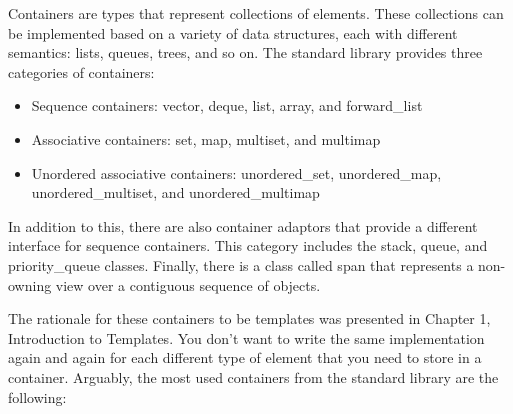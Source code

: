 Containers are types that represent collections of elements. These collections can be implemented based on a variety of data structures, each with different semantics: lists, queues, trees, and so on. The standard library provides three categories of containers:

\begin{itemize}
\item
Sequence containers: vector, deque, list, array, and forward\_list

\item
Associative containers: set, map, multiset, and multimap

\item
Unordered associative containers: unordered\_set, unordered\_map, unordered\_multiset, and unordered\_multimap
\end{itemize}

In addition to this, there are also container adaptors that provide a different interface for sequence containers. This category includes the stack, queue, and priority\_queue classes. Finally, there is a class called span that represents a non-owning view over a contiguous sequence of objects.

The rationale for these containers to be templates was presented in Chapter 1, Introduction to Templates. You don’t want to write the same implementation again and again for each different type of element that you need to store in a container. Arguably, the most used containers from the standard library are the following:


